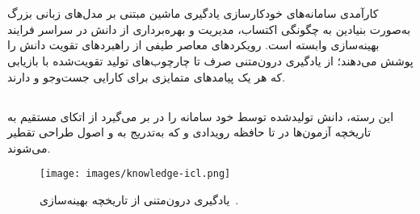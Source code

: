 \section[تحلیل منابع دانش]{}

کارآمدی سامانه‌های خودکارسازی یادگیری ماشین مبتنی بر مدل‌های زبانی بزرگ به‌صورت بنیادین به چگونگی اکتساب، مدیریت و بهره‌برداری از دانش در سراسر فرایند بهینه‌سازی وابسته است. رویکردهای معاصر طیفی از راهبردهای تقویت دانش را پوشش می‌دهند؛ از یادگیری درون‌متنی صرف تا چارچوب‌های تولید تقویت‌شده با بازیابی که هر یک پیامدهای متمایزی برای کارایی جست‌وجو و  دارند.

\subsection[دانش درونی: تاریخچه آزمون و بازتاب]{}
این رسته، دانش تولیدشده توسط خود سامانه را در بر می‌گیرد از اتکای مستقیم به تاریخچه آزمون‌ها در  تا حافظه رویدادی و  که به‌تدریج به  و اصول طراحی تقطیر می‌شوند.
\begin{figure}[h!]
    \centering
    \texttt{[image: images/knowledge-icl.png]}
    \caption[یادگیری درون‌متنی از تاریخچه بهینه‌سازی]{یادگیری درون‌متنی از تاریخچه بهینه‌سازی~\cite{liu2025agenthpo}.
    }
    \label{fig:knowledge-icl}
\end{figure}
\subsubsection{\protect{}}

